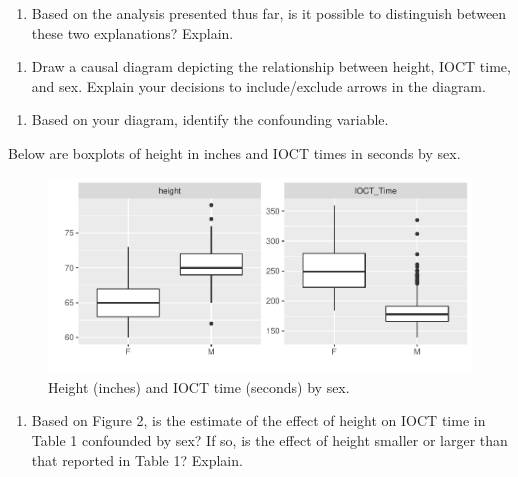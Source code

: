 \documentclass[]{book}
\providecommand{\tightlist}{%
  \setlength{\itemsep}{0pt}\setlength{\parskip}{0pt}}
\begin{document}
\vspace{1in}

\begin{enumerate}
\def\labelenumi{\arabic{enumi}.}
\setcounter{enumi}{9}
\tightlist
\item
  Based on the analysis presented thus far, is it possible to distinguish between these two explanations? Explain.
\end{enumerate}

\vspace{1in}

\begin{enumerate}
\def\labelenumi{\arabic{enumi}.}
\setcounter{enumi}{10}
\tightlist
\item
  Draw a causal diagram depicting the relationship between height, IOCT time, and sex. Explain your decisions to include/exclude arrows in the diagram.
\end{enumerate}

\vspace{1in}

\begin{enumerate}
\def\labelenumi{\arabic{enumi}.}
\setcounter{enumi}{11}
\tightlist
\item
  Based on your diagram, identify the confounding variable.
\end{enumerate}

\vspace{0.5in}

Below are boxplots of height in inches and IOCT times in seconds by sex.

\begin{figure}
\centering
\includegraphics{MA206supplement_files/figure-latex/unnamed-chunk-17-1.pdf}
\caption{\label{fig:unnamed-chunk-17}Height (inches) and IOCT time (seconds) by sex.}
\end{figure}

\begin{enumerate}
\def\labelenumi{\arabic{enumi}.}
\setcounter{enumi}{12}
\tightlist
\item
  Based on Figure 2, is the estimate of the effect of height on IOCT time in Table 1 confounded by sex? If so, is the effect of height smaller or larger than that reported in Table 1? Explain.
\end{enumerate}
\end{document}

